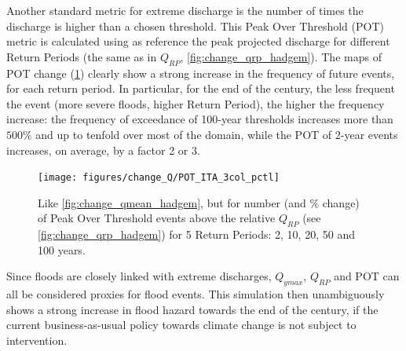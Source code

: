Another standard metric for extreme discharge is the number of times the discharge is higher than a chosen threshold. This Peak Over Threshold (POT) metric is calculated using as reference the peak projected discharge for different Return Periods (the same as in $Q_{RP}$,  \cref{fig:change_qrp_hadgem}).
The maps of POT change (\cref{fig:change_pot_hadgem}) clearly show a strong increase in the frequency of future events, for each return period.
In particular, for the end of the century, the less frequent the event (more severe floods, higher Return Period), the higher the frequency increase: the frequency of exceedance of 100-year thresholds increases more than $500\%$ and up to tenfold over most of the domain, while the POT of 2-year events increases, on average, by a factor 2 or 3.
\begin{figure}
    \centering
    \texttt{[image: figures/change\_Q/POT\_ITA\_3col\_pctl]}
    \decoRule
    \caption[Peak over threshold change in CHyM (HadGEM)]{
        Like \cref{fig:change_qmean_hadgem}, but for number (and \% change) of Peak Over Threshold events above the relative $Q_{RP}$ (see \cref{fig:change_qrp_hadgem}) for 5 Return Periods: 2, 10, 20, 50 and 100 years.
    } \label{fig:change_pot_hadgem}
\end{figure}

Since floods are closely linked with extreme discharges, $Q_{ymax}$, $Q_{RP}$ and POT can all be considered proxies for flood events.
This simulation then unambiguously shows a strong increase in flood hazard towards the end of the century, if the current business-as-usual policy towards climate change is not subject to intervention.

